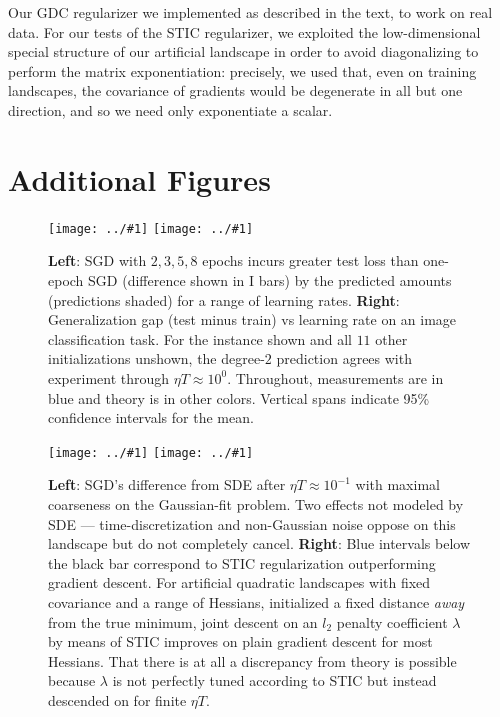 \documentclass{article}
\theoremstyle{plain}
\theoremstyle{definition}
\newcommand{\plotmoow}[3]{\texttt{[image: ../\#1]}}
\begin{document}
        Our GDC regularizer we implemented as described in the text, to work
        on real data.  For our tests of the STIC regularizer, we exploited the
        low-dimensional special structure of our artificial landscape in order
        to avoid diagonalizing to perform the matrix exponentiation: precisely,
        we used that, even on training landscapes, the covariance of gradients
        would be degenerate in all but one direction, and so we need only 
        exponentiate a scalar.

\section{Additional Figures}\label{sect:figures}

    \begin{figure}[h]
        \centering
        \plotmoow{plots/multi-fashion-logistic-0}{0.48\columnwidth}{4.0cm}
        \plotmoow{plots/gen-cifar}{0.48\columnwidth}{3.0cm}
        \caption{
            {\bf Left}: SGD with $2, 3, 5, 8$ epochs incurs greater test
            loss than one-epoch SGD (difference shown in I bars) by the
            predicted amounts (predictions shaded) for a range of learning
            rates.
            {\bf Right}:
            Generalization gap (test minus train) vs learning rate on an
            image classification task.  For the instance shown and all $11$
            other initializations unshown, the degree-$2$ prediction agrees
            with experiment through $\eta T \approx 10^0$.  Throughout,
            measurements are in blue and theory is in other colors.
            Vertical spans indicate 95\% confidence intervals for the mean.
        }
        \label{fig:multiandgen}
    \end{figure}

    \begin{figure}[h] 
        \centering
        \plotmoow{plots/vs-sde}{0.48\columnwidth}{4.0cm}
        \plotmoow{plots/tak-reg}{0.48\columnwidth}{4.0cm}
        \caption{
            {\bf Left}: SGD's difference from SDE after $\eta T \approx
            10^{-1}$ with maximal coarseness on the Gaussian-fit problem.  
            Two effects not modeled by SDE --- time-discretization and
            non-Gaussian noise oppose on this landscape but do not
            completely cancel. 
            {\bf Right}: Blue intervals below the black bar correspond to STIC
            regularization outperforming gradient descent. For artificial
            quadratic landscapes with fixed covariance and a range of Hessians,
            initialized a fixed distance \emph{away} from the true minimum,
            joint descent on an $l_2$ penalty coefficient $\lambda$ by means of
            STIC improves on plain gradient descent for most Hessians.  That
            there is at all a discrepancy from theory is possible because
            $\lambda$ is not perfectly tuned according to STIC but instead
            descended on for finite $\eta T$.
        }
        \label{fig:vssdeandtakreg}
    \end{figure}
\end{document}

